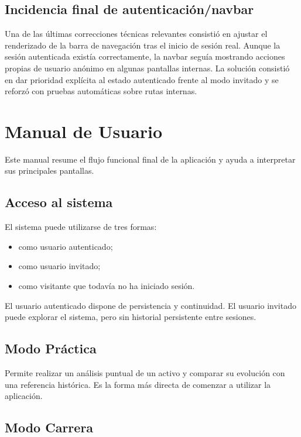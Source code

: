 \section{Incidencia final de autenticación/navbar}

Una de las últimas correcciones técnicas relevantes consistió en ajustar el renderizado de la barra de navegación tras el inicio de sesión real. Aunque la sesión autenticada existía correctamente, la navbar seguía mostrando acciones propias de usuario anónimo en algunas pantallas internas. La solución consistió en dar prioridad explícita al estado autenticado frente al modo invitado y se reforzó con pruebas automáticas sobre rutas internas.

\chapter{Manual de Usuario}
\label{appendix:manual_usuario}

Este manual resume el flujo funcional final de la aplicación y ayuda a interpretar sus principales pantallas.

\section{Acceso al sistema}

El sistema puede utilizarse de tres formas:
\begin{itemize}
    \item como usuario autenticado;
    \item como usuario invitado;
    \item como visitante que todavía no ha iniciado sesión.
\end{itemize}

El usuario autenticado dispone de persistencia y continuidad. El usuario invitado puede explorar el sistema, pero sin historial persistente entre sesiones.

\section{Modo Práctica}

Permite realizar un análisis puntual de un activo y comparar su evolución con una referencia histórica. Es la forma más directa de comenzar a utilizar la aplicación.

\section{Modo Carrera}


